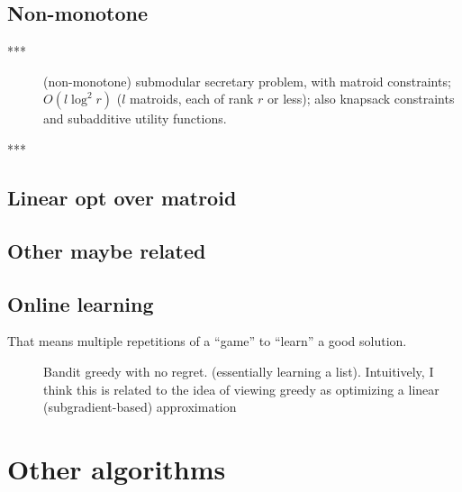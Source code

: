\documentclass{article}
\begin{document}
\subsection{Non-monotone}

\begin{description}
\item[\cite{bateni10}***] (non-monotone) submodular secretary problem, with matroid constraints; $O(l \log^2 r)$ ($l$ matroids, each of rank $r$ or less); also knapsack constraints and subadditive utility functions.
\item[\citet{gupta10}***] 
\end{description}

\subsection{Linear opt over matroid}
\begin{description}
\item[\citet{babaioff}]
\item[\citet{ogharan11}]
\item[\citet{imXX}] 
\end{description}

\subsection{Other maybe related}
\begin{description}
\item[\citet{feldman12parallel}] 
\end{description}


\subsection{Online learning}

That means multiple repetitions of a ``game'' to ``learn'' a good solution.

\begin{description}
\item[\citet{ross13}] Bandit greedy with no regret. (essentially learning a list). Intuitively, I think this is related to the idea of viewing greedy as optimizing a linear (subgradient-based) approximation \citep{iyer13icml}
\item[\citet{streeter09}] 
\end{description}


\section{Other algorithms}
\end{document}
